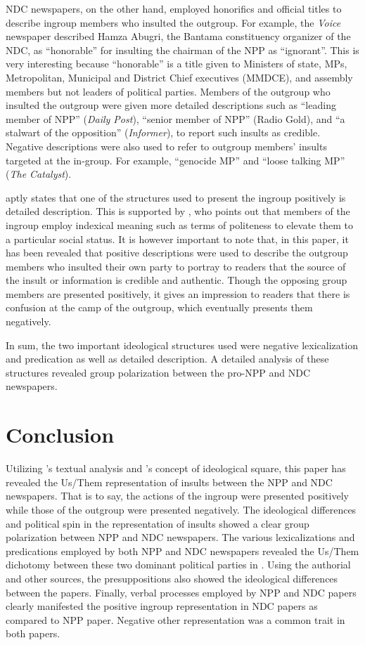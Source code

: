 \documentclass[output=paper,modfonts]{langscibook}
\begin{document}
NDC newspapers, on the other hand, employed honorifics and official titles to describe ingroup members who insulted the outgroup. For example, the \textit{Voice} newspaper described Hamza Abugri, the Bantama constituency organizer of the NDC, as “honorable” for insulting the chairman of the NPP as “ignorant”. This is very interesting because “honorable” is a title given to Ministers of state, MPs, Metropolitan, Municipal and District Chief executives (MMDCE), and assembly members but not leaders of political parties. Members of the outgroup who insulted the outgroup were given more detailed descriptions such as “leading member of NPP” (\textit{Daily Post}), “senior member of NPP” (Radio Gold), and “a stalwart of the opposition” (\textit{Informer}), to report such insults as credible. Negative descriptions were also used to refer to outgroup members’ insults targeted at the in-group. For example, “genocide MP” and “loose talking MP” (\textit{The Catalyst}).

 aptly states that one of the structures used to present the ingroup positively is detailed description. This is supported by \citet{Blommaert2005}, who points out that members of the ingroup employ indexical meaning such as terms of politeness to elevate them to a particular social status. It is however important to note that, in this paper, it has been revealed that positive descriptions were used to describe the outgroup members who insulted their own party to portray to readers that the source of the insult or information is credible and authentic. Though the opposing group members are presented positively, it gives an impression to readers that there is confusion at the camp of the outgroup, which eventually presents them negatively.

In sum, the two important ideological structures used were negative lexicalization and predication as well as detailed description. A detailed analysis of these structures revealed group polarization between the pro-NPP and NDC newspapers.

\section{Conclusion}\label{sec:ofori:5}

Utilizing \citeauthor{Fairclough1995}’s textual analysis and \citeauthor{vanDijk2001}’s concept of ideological square, this paper has revealed the Us/Them representation of insults between the NPP and NDC newspapers. That is to say, the actions of the ingroup were presented positively while those of the outgroup were presented negatively. The ideological differences and political spin in the representation of insults showed a clear group polarization between NPP and NDC newspapers. The various lexicalizations and predications employed by both NPP and NDC newspapers revealed the Us/Them dichotomy between these two dominant political parties in . Using the authorial  and other sources, the presuppositions also showed the ideological differences between the papers. Finally, verbal processes employed by NPP and NDC papers clearly manifested the positive ingroup representation in NDC papers as compared to NPP paper. Negative other representation was a common trait in both papers.
 
 {\sloppy
\printbibliography[heading=subbibliography,notkeyword=this]
}
\end{document}
